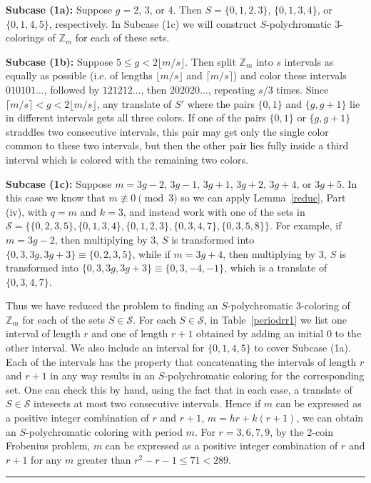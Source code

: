 \documentclass[12pt]{article}
\newenvironment{proofof}[1]{{\bf Proof of #1:  }}{\hfill\rule{2mm}{2mm}}
\newcommand{\Z}{\ensuremath{\mathbb Z}}
\begin{document}
\begin{proofof}{Theorem~\ref{ps34}}
\textbf{Subcase (1a):} Suppose $g=2$, $3$, or $4$. Then $S = \{0,1,2,3\}$,  $\{0,1,3,4\}$, or $\{0,1,4,5\}$, respectively.  In Subcase (1c) we will construct $S$-polychromatic 3-colorings of $\Z_m$ for each of these sets.

\textbf{Subcase (1b):}  Suppose $5 \le g<2\lfloor m/s \rfloor$. Then split $\Z_m$ into $s$ intervals as equally as possible (i.e. of lengths $\lfloor m/s\rfloor$ and $\lceil m/s \rceil$) and color these intervals $010101\ldots$, followed by $121212\ldots$, then $202020\ldots$, repeating $s/3$ times. Since $\lceil m/s\rceil<g<2\lfloor m/s \rfloor$, any translate of $S'$ where the pairs $\{0,1\}$ and $\{g,g+1\}$ lie in different intervals gets all three colors. If one of the pairs $\{0,1\}$ or $\{g,g+1\}$ straddles two consecutive intervals, this pair may get only the single color common to these two intervals, but then the other pair lies fully inside a third interval which is colored with the remaining two colors.

\textbf{Subcase (1c):} Suppose  $m=3g-2$, $3g-1$, $3g+1$, $3g+2$, $3g+4$, or $3g+5$. In this case we know that $m\not\equiv 0 \pmod{3}$ so we can apply Lemma~\ref{reduc}, Part (iv), with $q=m$ and $k=3$, and instead work with one of the sets in $\mathcal{S} =  \{\{0,2,3,5\}, \{0,1,3,4\}, \{0,1,2,3\}, \{0,3,4,7\}, \{0,3,5,8\}\}$. For example, if $m=3g-2$, then multiplying by 3, $S$ is transformed into $\{0,3,3g,3g+3\} \equiv \{0,2,3,5\}$, while if $m=3g+4$, then multiplying by 3, $S$ is transformed into $\{0,3,3g,3g+3\} \equiv \{0,3,-4,-1\}$, which is a translate of $\{0,3,4,7\}$.

Thus we have reduced the problem to finding an $S$-polychromatic 3-coloring of $\Z_m$ for each of the sets $S\in \mathcal{S}$. For each $S\in \mathcal{S}$, in Table~\ref{periodrr1} we list one interval of length $r$ and one of length $r+1$ obtained by adding an initial 0 to the other interval. We  also include an interval for $\{0,1,4,5\}$ to cover Subcase (1a).  Each of the intervals has the property that concatenating the intervals of length $r$ and $r+1$ in any way results in an $S$-polychromatic coloring for the corresponding set.  One can check this by hand, using the fact that in each case, a translate of $S\in \mathcal{S}$ intesects at most two consecutive intervals. Hence if $m$ can be expressed as a positive integer combination of $r$ and $r+1$, $m=hr + k(r+1)$, we can obtain an $S$-polychromatic coloring with period $m$. For $r=3,6,7,9$, by the 2-coin Frobenius problem, $m$ can be expressed as a positive integer combination of $r$ and $r+1$ for any $m$ greater than $r^2-r-1\leq 71<289$.


\end{proofof}
\end{document}
